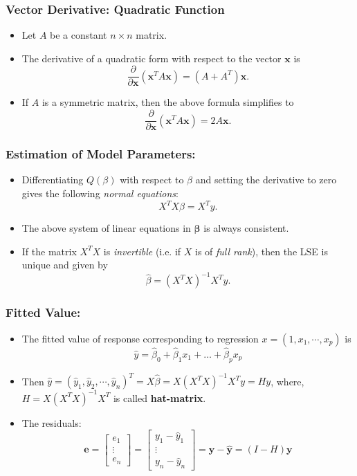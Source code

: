 \documentclass[10pt]{beamer} %
\begin{document}
\begin{frame}
    \frametitle{Vector Derivative: Quadratic Function}
    \begin{itemize}
       \item Let $A$ be a constant $n \times n$ matrix.
          \bigskip
       \item The derivative of a quadratic form with respect to the vector
       $\boldsymbol{x}$ is
          \[ \frac{\partial}{\partial \boldsymbol{x}} (\boldsymbol{x}^T A
          \boldsymbol{x}) = \left( A + A^T \right) \boldsymbol{x}. \]
       \item If $A$ is a symmetric matrix, then the above formula simplifies to
          \[ \frac{\partial}{\partial \boldsymbol{x}} \left( \boldsymbol{x}^T A
             \boldsymbol{x} \right) = 2A \boldsymbol{x}. \]
    \end{itemize}
\end{frame}

\begin{frame}
   \frametitle{Estimation of Model Parameters: }
   \begin{itemize}
      \item Differentiating $Q(\beta)$ with respect to $\beta$ and setting the
         derivative to zero gives the following \emph{normal equations}:
         $$X^TX\beta = X^Ty.$$
      \item The above system of linear equations in $\boldsymbol{\beta}$ is
         always consistent.
         \bigskip
      \item If the matrix $X^TX$ is \emph{invertible} (i.e. if $X$ is of
         \emph{full rank}), then the LSE is unique and given by
         $$\hat\beta = (X^TX)^{-1}X^Ty.$$
   \end{itemize}	
\end{frame}


\begin{frame}
   \frametitle{Fitted Value: }
   \begin{itemize}
      \item The fitted value of response corresponding to regression
         $x = (1, x_1, \cdots, x_p)$ is $$\hat{y} = \hat\beta_0 +
         \hat\beta_1x_{1} + \ldots + \hat\beta_px_{p} $$
      \item Then $\hat y = (\hat y_1, \hat y_2, \cdots, \hat y_n)^T = X\hat\beta
         = X(X^TX)^{-1}X^Ty = Hy$, where, $H = X(X^TX)^{-1}X^T$ is called
         \textbf{hat-matrix}. 
         \vspace{0.5cm}
      \item The residuals: 
         $$\boldsymbol{e}= \begin{bmatrix}
            e_1 \\ \vdots \\ e_n
         \end{bmatrix} 
         = \begin{bmatrix}
            y_1 - \hat y_1 \\ \vdots \\ y_n - \hat y_n
         \end{bmatrix} 
         = \boldsymbol{y}- \hat{\boldsymbol{y}}
         = (I - H)\boldsymbol{y}$$
   \end{itemize}	
\end{frame}
\end{document}
